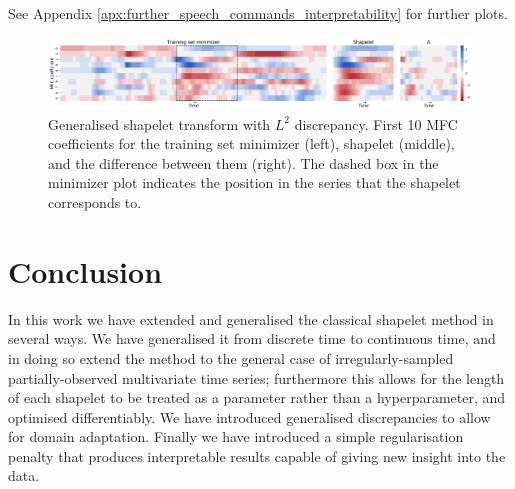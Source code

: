 \documentclass{article}
\theoremstyle{plain}
\theoremstyle{definition}
\begin{document}
See Appendix \ref{apx:further_speech_commands_interpretability} for further plots.
\begin{figure}
			\centering
			\caption{Generalised shapelet transform with $L^2$ discrepancy. First 10 MFC coefficients for the training set minimizer (left), shapelet (middle), and the difference between them (right). The dashed box in the minimizer plot indicates the position in the series that the shapelet corresponds to.}\label{fig:speech_commands}
			\includegraphics[width=\linewidth]{images/new_speech_commands_heatmap.png}
\end{figure}




	\section{Conclusion}
	In this work we have extended and generalised the classical shapelet method in several ways. We have generalised it from discrete time to continuous time, and in doing so extend the method to the general case of irregularly-sampled partially-observed multivariate time series; furthermore this allows for the length of each shapelet to be treated as a parameter rather than a hyperparameter, and optimised differentiably. We have introduced generalised discrepancies to allow for domain adaptation. Finally we have introduced a simple regularisation penalty that produces interpretable results capable of giving new insight into the data.
	
\end{document}
